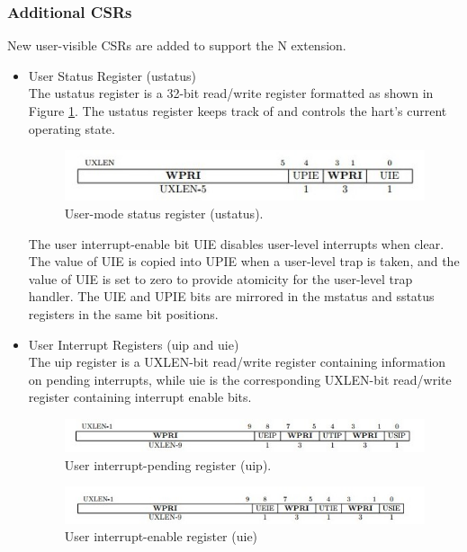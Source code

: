 \documentclass[../main.tex]{subfiles}
\begin{document}
\subsubsection{Additional CSRs}
New user-visible CSRs are added to support the N extension.
\begin{itemize}
    \item User Status Register (ustatus)\\
        The ustatus register is a 32-bit read/write register formatted as shown in Figure \ref{fig:ustatus}. The ustatus register keeps track of and controls the hart’s current operating state.
        
        \begin{figure}[h!]
            \centering
            \includegraphics[width=10 cm]{diagrams/ustatus.jpg}
            \caption{User-mode status register (ustatus).}
            \label{fig:ustatus}
        \end{figure}

        The user interrupt-enable bit UIE disables user-level interrupts when clear. The value of UIE is copied into UPIE when a user-level trap is taken, and the value of UIE is set to zero to provide atomicity for the user-level trap handler. The UIE and UPIE bits are mirrored in the mstatus and sstatus registers in the same bit positions.\\

    \item User Interrupt Registers (uip and uie)\\
        The uip register is a UXLEN-bit read/write register containing information on pending interrupts, while uie is the corresponding UXLEN-bit read/write register containing interrupt enable bits.
        \begin{figure}[h!]
            \centering
            \includegraphics[width=15 cm]{diagrams/uip.jpg}
            \caption{User interrupt-pending register (uip).}
            \label{fig:uip}
        \end{figure}

        \begin{figure}[h!]
            \centering
            \includegraphics[width=15 cm]{diagrams/uie.jpg}
            \caption{User interrupt-enable register (uie)}
            \label{fig:uie}
        \end{figure}


\end{itemize}
\end{document}

